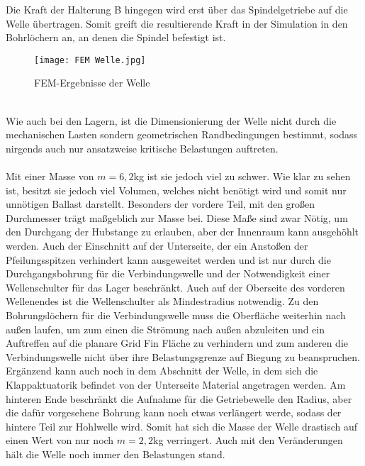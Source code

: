 Die Kraft der Halterung B hingegen wird erst über das Spindelgetriebe auf die Welle übertragen. Somit greift die resultierende Kraft in der Simulation in den Bohrlöchern an, an denen die Spindel befestigt ist.
\begin{figure}[h] 
	\centering
	\texttt{[image: FEM Welle.jpg]}
	\caption{FEM-Ergebnisse der Welle}
	\label{abb_Well_FEM}
\end{figure}\\
Wie auch bei den Lagern, ist die Dimensionierung der Welle nicht durch die mechanischen Lasten sondern geometrischen Randbedingungen bestimmt, sodass nirgends auch nur ansatzweise kritische Belastungen auftreten.
\\~\\
Mit einer Masse von $m=6,2$kg ist sie jedoch viel zu schwer. Wie klar zu sehen ist, besitzt sie jedoch viel Volumen, welches nicht benötigt wird und somit nur unnötigen Ballast darstellt. Besonders der vordere Teil, mit den großen Durchmesser trägt maßgeblich zur Masse bei. Diese Maße sind zwar Nötig, um den Durchgang der Hubstange zu erlauben, aber der Innenraum kann ausgehöhlt werden. Auch der Einschnitt auf der Unterseite, der ein Anstoßen der Pfeilungsspitzen verhindert kann ausgeweitet werden und ist nur durch die Durchgangsbohrung für die Verbindungswelle und der Notwendigkeit einer Wellenschulter für das Lager beschränkt. Auch auf der Oberseite des vorderen Wellenendes ist die Wellenschulter als Mindestradius notwendig. Zu den Bohrungslöchern für die Verbindungswelle muss die Oberfläche weiterhin nach außen laufen, um zum einen die Strömung nach außen abzuleiten und ein Auftreffen auf die planare Grid Fin Fläche zu verhindern und zum anderen die Verbindungswelle nicht über ihre Belastungsgrenze auf Biegung zu beanspruchen. Ergänzend kann auch noch in dem Abschnitt der Welle, in dem sich die Klappaktuatorik befindet von der Unterseite Material angetragen werden. Am hinteren Ende beschränkt die Aufnahme für die Getriebewelle den Radius, aber die dafür vorgesehene Bohrung kann noch etwas verlängert werde, sodass der hintere Teil zur Hohlwelle wird. Somit hat sich die Masse der Welle drastisch auf einen Wert von nur noch $m= 2,2$kg verringert. Auch mit den Veränderungen hält die Welle noch immer den Belastungen stand.

